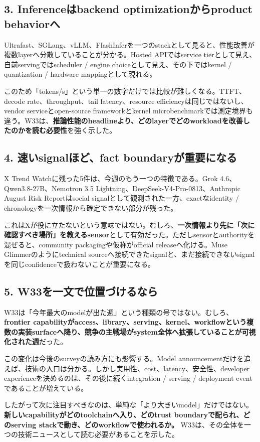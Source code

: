 \subsection*{3. Inferenceはbackend optimizationからproduct behaviorへ}

Ultrafast、SGLang、vLLM、FlashInferを一つのstackとして見ると、性能改善が複数layerへ分散していることが分かる\cite{openai-ultrafast,sglang-0517-w33,vllm-0270,flashinfer-0617}。Hosted APIではservice tierとして見え、自前servingではscheduler / engine choiceとして見え、その下ではkernel / quantization / hardware mappingとして現れる。

このため「tokens/s」という単一の数字だけでは比較が難しくなる。TTFT、decode rate、throughput、tail latency、resource efficiencyは同じではないし、vendor serviceとopen-source frameworkとkernel microbenchmarkでは測定境界も違う。W33は、\textbf{推論性能のheadlineより、どのlayerでどのworkloadを改善したのかを読む必要性}を強く示した。

\subsection*{4. 速いsignalほど、fact boundaryが重要になる}

X Trend Watchに残った5件は、今週のもう一つの特徴である。Grok 4.6、Qwen3.8-27B、Nemotron 3.5 Lightning、DeepSeek-V4-Pro-0813、Anthropic August Risk Reportはsocial signalとして観測された一方、exactなidentity / chronologyを一次情報から確定できない部分が残った\cite{w33-grok-r3-observation,w33-grok-r3-review}。

これはXが役に立たないという意味ではない。むしろ、\textbf{一次情報より先に「次に確認すべき場所」を教えるsensor}として有効だった。ただしsensorとauthorityを混ぜると、community packagingや仮称がofficial releaseへ化ける。Muse Glimmerのようにtechnical sourceへ接続できたsignalと、まだ接続できないsignalを同じconfidenceで扱わないことが重要になる。

\subsection*{5. W33を一文で位置づけるなら}

W33は「今年最大のmodelが出た週」という種類の号ではない。むしろ、\textbf{frontier capabilityがaccess、library、serving、kernel、workflowという複数の実装surfaceへ降り、競争の主戦場がsystem全体へ拡張していることが可視化された週}だった。

この変化は今後のsurveyの読み方にも影響する。Model announcementだけを追えば、技術の入口は分かる。しかし実用性、cost、latency、安全性、developer experienceを決めるのは、その後に続くintegration / serving / deployment eventであることが増えている。

したがって次に注目すべきなのは、単純な「より大きいmodel」だけではない。\textbf{新しいcapabilityがどのtoolchainへ入り、どのtrust boundaryで配られ、どのserving stackで動き、どのworkflowで使われるか。} W33は、その全体を一つの技術ニュースとして読む必要があることを示した。
